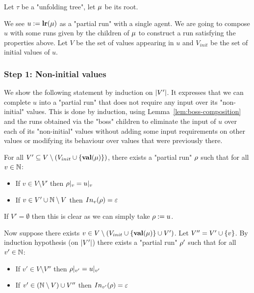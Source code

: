 	Let $\tau$ be a "unfolding tree", let $\node$ be its root.
	
	We see $u := \localrunlabel{\node}$ as a "partial run" with a single agent.
	We are going to compose $u$ with some runs given by the children of $\node$ to construct a run satisfying the properties above.
	Let $V$ be the set of values appearing in $u$ and $V_{init}$ be the set of initial values of $u$.
	
	
	\subsubsection{Step 1: Non-initial values}
	\label{sec:tree-to-run-step-one}
	
	We show the following statement by induction on $\size{V'}$. It expresses that we can complete $u$ into a "partial run" that does not require any input over its "non-initial" values. This is done by induction, using Lemma~\ref{lem:boss-composition} and the runs obtained via the "boss" children to eliminate the input of $u$ over each of its "non-initial" values without adding some input requirements on other values or modifying its behaviour over values that were previously there.
	
For all $V' \subseteq V \setminus (V_{init}\cup \set{\valuelabel{\node}})$, there exists a "partial run" $\run$ such that for all $v \in \nats$:
\begin{itemize}
	\item If $v \in V \setminus V'$ then $\vproj{v}{\run} = \vproj{v}{u}$
	
	\item If $v \in V' \cup \nats \setminus V$ then $\vinput{v}{\run} = \epsilon$
\end{itemize}  
	
	If $V' = \emptyset$ then this is clear as we can simply take $\run := \localrun$.
	
	Now suppose there exists $v \in V \setminus (V_{init}\cup \set{\valuelabel{\node}} \cup V')$. Let $V'' = V' \cup \set{v}$. By induction hypothesis (on $\size{V'}$) there exists a "partial run" $\run'$ such that for all $v' \in \nats$:
	\begin{itemize}
		\item If $v' \in V \setminus V''$ then $\vproj{v'}{\run} = \vproj{v'}{u}$
		
		\item If $v' \in (\nats \setminus V) \cup V''$ then $\vinput{v'}{\run} = \epsilon$
	\end{itemize}

